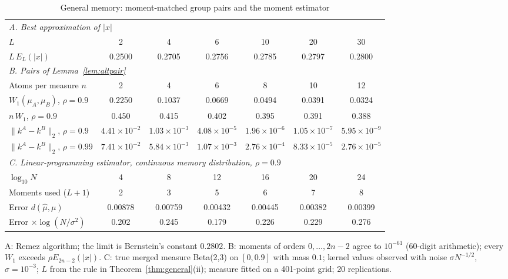 \documentclass[12pt]{article}
\theoremstyle{definition}
\theoremstyle{remark}
\begin{document}
\begin{table}[t]\centering\small
\begin{threeparttable}
\caption{General memory: moment-matched group pairs and the moment estimator}\label{tab:general}
\setlength{\tabcolsep}{3.5pt}
\begin{tabular}{lcccccc}
\toprule
\multicolumn{7}{l}{\emph{A. Best approximation of $|x|$}}\\
$L$ & 2 & 4 & 6 & 10 & 20 & 30\\
$L\,E_L(|x|)$ & 0.2500 & 0.2705 & 0.2756 & 0.2785 & 0.2797 & 0.2800\\
\midrule
\multicolumn{7}{l}{\emph{B. Pairs of Lemma~\ref{lem:altpair}}}\\
Atoms per measure $n$ & 2 & 4 & 6 & 8 & 10 & 12\\
$W_1(\mu_A,\mu_B)$, $\rho=0.9$ & 0.2250 & 0.1037 & 0.0669 & 0.0494 & 0.0391 & 0.0324\\
$n\,W_1$, $\rho=0.9$ & 0.450 & 0.415 & 0.402 & 0.395 & 0.391 & 0.388\\
$\|k^A-k^B\|_2$, $\rho=0.9$ & $4.41\times10^{-2}$ & $1.03\times10^{-3}$ & $4.08\times10^{-5}$ & $1.96\times10^{-6}$ & $1.05\times10^{-7}$ & $5.95\times10^{-9}$\\
$\|k^A-k^B\|_2$, $\rho=0.99$ & $7.41\times10^{-2}$ & $5.84\times10^{-3}$ & $1.07\times10^{-3}$ & $2.76\times10^{-4}$ & $8.33\times10^{-5}$ & $2.76\times10^{-5}$\\
\midrule
\multicolumn{7}{l}{\emph{C. Linear-programming estimator, continuous memory distribution, $\rho=0.9$}}\\
$\log_{10}N$ & 4 & 8 & 12 & 16 & 20 & 24\\
Moments used ($L+1$) & 2 & 3 & 5 & 6 & 7 & 8\\
Error $d(\hat\mu,\mu)$ & 0.00878 & 0.00759 & 0.00432 & 0.00445 & 0.00382 & 0.00399\\
Error $\times\log(N/\sigma^2)$ & 0.202 & 0.245 & 0.179 & 0.226 & 0.229 & 0.276\\
\bottomrule
\end{tabular}
\begin{tablenotes}\footnotesize\item A: Remez algorithm; the limit is Bernstein's constant $0.2802$. B: moments of orders $0,\ldots,2n-2$ agree to $10^{-61}$ (60-digit arithmetic); every $W_1$ exceeds $\rho E_{2n-2}(|x|)$. C: true merged measure Beta(2,3) on $[0,0.9]$ with mass $0.1$; kernel values observed with noise $\sigma N^{-1/2}$, $\sigma=10^{-3}$; $L$ from the rule in Theorem~\ref{thm:general}(ii); measure fitted on a 401-point grid; 20 replications.\end{tablenotes}
\end{threeparttable}
\end{table}
\end{document}
